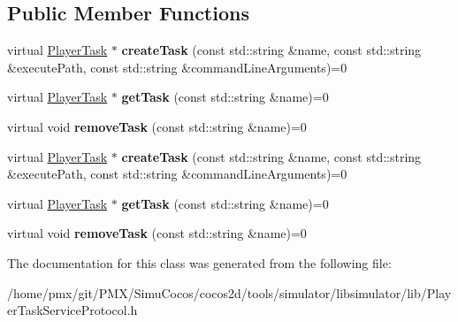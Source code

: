 \subsection*{Public Member Functions}
\begin{DoxyCompactItemize}
\item 
\mbox{\label{classPlayerTaskServiceProtocol_afa3ff9b95ed224942579d9a53e47c9cb}} 
virtual \hyperlink{classPlayerTask}{Player\+Task} $\ast$ {\bfseries create\+Task} (const std\+::string \&name, const std\+::string \&execute\+Path, const std\+::string \&command\+Line\+Arguments)=0
\item 
\mbox{\label{classPlayerTaskServiceProtocol_a78ca7ede7a5222d073056fa36cf47ee5}} 
virtual \hyperlink{classPlayerTask}{Player\+Task} $\ast$ {\bfseries get\+Task} (const std\+::string \&name)=0
\item 
\mbox{\label{classPlayerTaskServiceProtocol_a15b59ed13780ee4a5155c33af1625405}} 
virtual void {\bfseries remove\+Task} (const std\+::string \&name)=0
\item 
\mbox{\label{classPlayerTaskServiceProtocol_afa3ff9b95ed224942579d9a53e47c9cb}} 
virtual \hyperlink{classPlayerTask}{Player\+Task} $\ast$ {\bfseries create\+Task} (const std\+::string \&name, const std\+::string \&execute\+Path, const std\+::string \&command\+Line\+Arguments)=0
\item 
\mbox{\label{classPlayerTaskServiceProtocol_a78ca7ede7a5222d073056fa36cf47ee5}} 
virtual \hyperlink{classPlayerTask}{Player\+Task} $\ast$ {\bfseries get\+Task} (const std\+::string \&name)=0
\item 
\mbox{\label{classPlayerTaskServiceProtocol_a15b59ed13780ee4a5155c33af1625405}} 
virtual void {\bfseries remove\+Task} (const std\+::string \&name)=0
\end{DoxyCompactItemize}


The documentation for this class was generated from the following file\+:\begin{DoxyCompactItemize}
\item 
/home/pmx/git/\+P\+M\+X/\+Simu\+Cocos/cocos2d/tools/simulator/libsimulator/lib/Player\+Task\+Service\+Protocol.\+h\end{DoxyCompactItemize}
